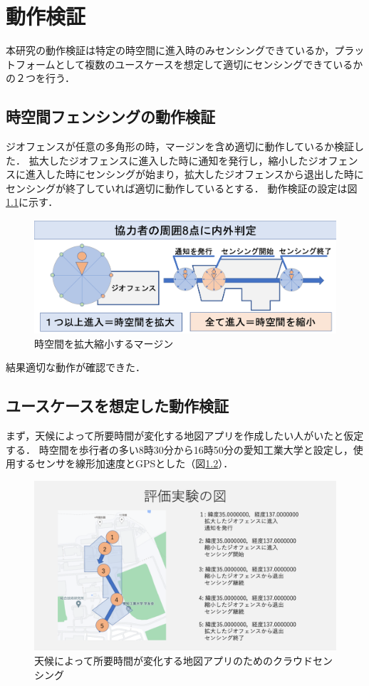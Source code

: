 \chapter{動作検証}
\thispagestyle{myheadings}
本研究の動作検証は特定の時空間に進入時のみセンシングできているか，プラットフォームとして複数のユースケースを想定して適切にセンシングできているかの２つを行う．

\section{時空間フェンシングの動作検証}
ジオフェンスが任意の多角形の時，マージンを含め適切に動作しているか検証した．
拡大したジオフェンスに進入した時に通知を発行し，縮小したジオフェンスに進入した時にセンシングが始まり，拡大したジオフェンスから退出した時にセンシングが終了していれば適切に動作しているとする．
動作検証の設定は図\ref{fig:ex_margin_1}に示す．

\begin{figure}[tbh]
    \centering
    \includegraphics[width=16cm]{img_margin_2.png}
    \caption{時空間を拡大縮小するマージン}
    \label{fig:ex_margin_1}
\end{figure}

結果適切な動作が確認できた．

\section{ユースケースを想定した動作検証}
まず，天候によって所要時間が変化する地図アプリを作成したい人がいたと仮定する．
時空間を歩行者の多い8時30分から16時50分の愛知工業大学と設定し，使用するセンサを線形加速度とGPSとした（図\ref{fig:ex_case_1}）．

\begin{figure}[tbh]
    \centering
    \includegraphics[width=16cm]{img_ex_case_1.png}
    \caption{天候によって所要時間が変化する地図アプリのためのクラウドセンシング}
    \label{fig:ex_case_1}
\end{figure}

